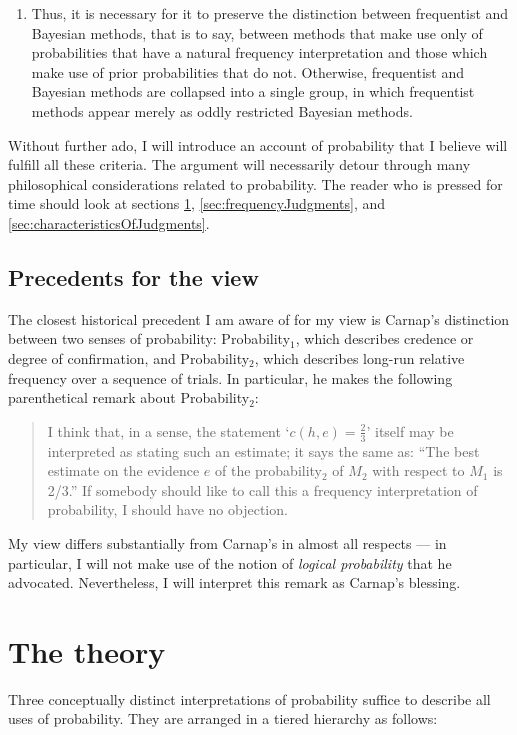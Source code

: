 \documentclass[letterpaper,12pt]{article}
\begin{document}
\begin{enumerate}
\item
Thus, it is necessary for it to preserve the distinction between frequentist and Bayesian methods, that is to say, between methods that make use only of probabilities that have a natural frequency interpretation and those which make use of prior probabilities that do not. Otherwise, frequentist and Bayesian methods are collapsed into a single group, in which frequentist methods appear merely as oddly restricted Bayesian methods.
\end{enumerate}

Without further ado, I will introduce an account of probability that I believe will fulfill all these criteria. The argument will necessarily detour through many philosophical considerations related to probability. The reader who is pressed for time should look at sections \ref{sec:theory}, \ref{sec:frequencyJudgments}, and \ref{sec:characteristicsOfJudgments}.

\subsection{Precedents for the view}
The closest historical precedent I am aware of for my view is Carnap's distinction \citeyearpar{Carnap1945-CARTTC} between two senses of probability: Probability$_1$, which describes credence or degree of confirmation, and Probability$_2$, which describes long-run relative frequency over a sequence of trials. In particular, he makes the following parenthetical remark about Probability$_2$:

\begin{quotation}
I think that, in a sense, the statement `$c(h, e) = \frac{2}{3}$' itself may be interpreted as stating such an estimate; it says the same as: ``The best estimate on the evidence $e$ of the probability$_2$ of $M_2$ with respect to $M_1$ is 2/3.'' If somebody should like to call this a frequency interpretation of probability, I should have no objection.
\end{quotation}

My view differs substantially from Carnap's in almost all respects --- in particular, I will not make use of the notion of \emph{logical probability} that he advocated. Nevertheless, I will interpret this remark as Carnap's blessing.

\section{The theory}
\label{sec:theory}
Three conceptually distinct interpretations of probability suffice to describe all uses of probability. They are arranged in a tiered hierarchy as follows:
\end{document}
